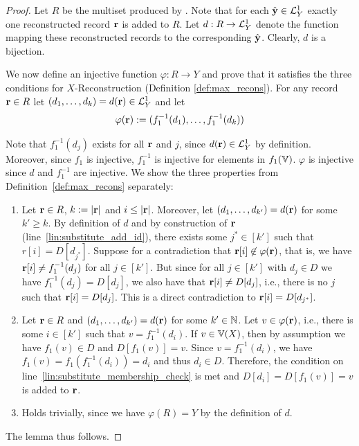 \begin{proof}
	Let $R$ be the multiset produced by \dictInfer.
	Note that for each $\hat{\mathbf{y}} \in \mathcal{L}^{1}_Y$ exactly one reconstructed record
        $\mathbf{r}$ is added to $R$. Let $d: R \to \mathcal{L}^{1}_Y$ denote the function mapping
        these reconstructed records to the corresponding $\hat{\mathbf{y}}$. Clearly, $d$ is
        a bijection.

	We now define an injective function $\varphi: R \to Y$ and prove that it
        satisfies the three conditions for $X$-Reconstruction (Definition
        \ref{def:max_recons}). For any record $\mathbf{r} \in R$ let
        $(d_1, \dots, d_k)=d(\mathbf{r}) \in \mathcal{L}^{1}_Y$ and let
	$$\varphi(\mathbf{r}) := (f_1^{-1}(d_1), \dots, f_1^{-1}(d_k))$$
	
	Note that $f_1^{-1}(d_j)$ exists for all $\mathbf{r}$ and $j$, since $d(\mathbf{r}) \in \mathcal{L}^{1}_Y$ by definition.
	Moreover, since $f_1$ is injective, $f_1^{-1}$ is injective for elements in $f_1(\Ispace)$.
	$\varphi$ is injective since $d$ and $f_1^{-1}$ are injective.
	We show the three properties from Definition~\ref{def:max_recons} separately:
	\begin{enumerate}
		\item Let $\mathbf{r} \in R$, $k := |\mathbf{r}|$ and $i \leq |\mathbf{r}|$. 
		Moreover, let $(d_1, \dots, d_{k'}) = d(\mathbf{r})$ for some $k' \geq k$.
		By definition of $d$ and by construction of $\mathbf{r}$ (line~\ref{lin:substitute_add_id}), 
		there exists some $j^*\in[k']$ such that $r[i] = D[d_{j^*}]$.
		Suppose for a contradiction that $\mathbf{r}[i] \not \in \varphi(\mathbf{r})$, that is,
		we have $\mathbf{r}[i] \neq f_1^{-1}(d_j)$ for all $j \in [k']$.
		But since for all $j \in [k']$ with $d_j \in D$ we have $f_1^{-1}(d_j) = D[d_j]$,
		we also have that $\mathbf{r}[i] \neq D[d_j]$, i.e., there is no $j$ such that $\mathbf{r}[i] = D[d_j]$. 
		This is a direct contradiction to $\mathbf{r}[i] = D[d_{j^*}]$.
		\item Let $\mathbf{r}\in R$ and $(d_1, \dots, d_{k'}) = d(\mathbf{r})$ for some $k' \in \mathbb{N}$.
		Let $v \in \varphi(\mathbf{r})$, 
		i.e., there is some $i \in [k']$ such that $v = f_1^{-1}(d_i)$.
		If $v \in \Ispace[X]$, then by assumption we have $f_1(v) \in D$ and $D[f_1(v)] = v$.
		Since $v = f_1^{-1}(d_i)$, we have $f_1(v) = f_1(f_1^{-1}(d_i)) = d_i$ 
		and thus $d_i \in D$. Therefore, the condition on line~\ref{lin:substitute_membership_check} is met and
		$D[d_i] = D[f_1(v)] = v$ is added to $\mathbf{r}$.
		\item Holds trivially, since we have $\varphi(R) = Y$ by the definition of $d$. 
	\end{enumerate}
The lemma thus follows.
\end{proof}

